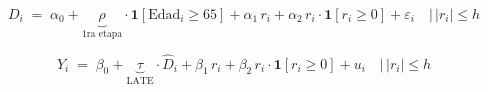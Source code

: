 


\begin{equation}
    \label{eq:first_stage}
    D_i
    \;=\;
    \alpha_0
    + \underbrace{\rho}_{\text{1ra etapa}}
        \cdot \mathbf{1}[\text{Edad}_i \geq 65]
    + \alpha_1 \, r_i
    + \alpha_2 \, r_i \cdot \mathbf{1}[r_i \geq 0]
    + \varepsilon_i
    \quad
    \left| \, |r_i| \leq h \right.
\end{equation}



\begin{equation}
    \label{eq:second_stage}
    Y_i
    \;=\;
    \beta_0
    + \underbrace{\tau}_{\text{LATE}}
        \cdot \widehat{D}_i
    + \beta_1 \, r_i
    + \beta_2 \, r_i \cdot \mathbf{1}[r_i \geq 0]
    + u_i
    \quad
    \left| \, |r_i| \leq h \right.
\end{equation}



